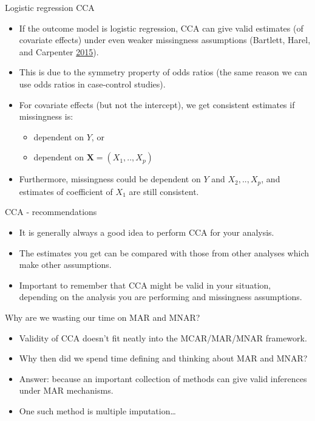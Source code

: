 \documentclass[ignorenonframetext,]{beamer}
\providecommand{\tightlist}{%
  \setlength{\itemsep}{0pt}\setlength{\parskip}{0pt}}
\begin{document}
\begin{frame}{Logistic regression CCA}
\protect\hypertarget{logistic-regression-cca}{}

\begin{itemize}
\tightlist
\item
  If the outcome model is logistic regression, CCA can give valid
  estimates (of covariate effects) under even weaker missingness
  assumptions (Bartlett, Harel, and Carpenter
  \protect\hyperlink{ref-Bartlett2015}{2015}).
\item
  This is due to the symmetry property of odds ratios (the same reason
  we can use odds ratios in case-control studies).
\item
  For covariate effects (but not the intercept), we get consistent
  estimates if missingness is:

  \begin{itemize}
  \tightlist
  \item
    dependent on \(Y\), or
  \item
    dependent on \(\mathbf X=(X_{1},..,X_{p})\)
  \end{itemize}
\item
  Furthermore, missingness could be dependent on \(Y\) and
  \(X_{2},..,X_{p}\), and estimates of coefficient of \(X_{1}\) are
  still consistent.
\end{itemize}

\end{frame}

\begin{frame}{CCA - recommendations}
\protect\hypertarget{cca---recommendations}{}

\begin{itemize}
\tightlist
\item
  It is generally always a good idea to perform CCA for your analysis.
\item
  The estimates you get can be compared with those from other analyses
  which make other assumptions.
\item
  Important to remember that CCA might be valid in your situation,
  depending on the analysis you are performing and missingness
  assumptions.
\end{itemize}

\end{frame}

\begin{frame}{Why are we wasting our time on MAR and MNAR?}
\protect\hypertarget{why-are-we-wasting-our-time-on-mar-and-mnar}{}

\begin{itemize}
\tightlist
\item
  Validity of CCA doesn't fit neatly into the MCAR/MAR/MNAR framework.
\item
  Why then did we spend time defining and thinking about MAR and MNAR?
\item
  Answer: because an important collection of methods can give valid
  inferences under MAR mechanisms.
\item
  One such method is multiple imputation\ldots{}
\end{itemize}

\end{frame}
\end{document}
